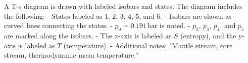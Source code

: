 A T-s diagram is drawn with labeled isobars and states. The diagram includes the following:  
- States labeled as 1, 2, 3, 4, 5, and 6.  
- Isobars are shown as curved lines connecting the states.  
- \( p_0 = 0.191 \, \text{bar} \) is noted.  
- \( p_2 \), \( p_3 \), \( p_4 \), and \( p_5 \) are marked along the isobars.  
- The x-axis is labeled as \( S \) (entropy), and the y-axis is labeled as \( T \) (temperature).  
- Additional notes: "Mantle stream, core stream, thermodynamic mean temperature."